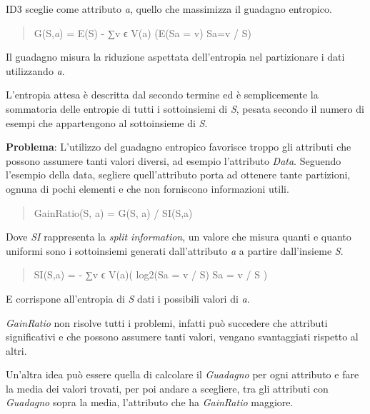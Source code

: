 ID3 sceglie come attributo \emph{a}, quello che massimizza il guadagno
entropico.

\begin{quote}
G(S,\emph{a}) = E(S) - ∑v ϵ V(a) (E(Sa = v) \textbar{}Sa=v\textbar{} /
\textbar{}S\textbar{})
\end{quote}

Il guadagno misura la riduzione aspettata dell'entropia nel partizionare
i dati utilizzando \emph{a}.

L'entropia attesa è descritta dal secondo termine ed è semplicemente la
sommatoria delle entropie di tutti i sottoinsiemi di \emph{S}, pesata
secondo il numero di esempi che appartengono al sottoinsieme di
\emph{S}.

\textbf{Problema}: L'utilizzo del guadagno entropico favorisce troppo
gli attributi che possono assumere tanti valori diversi, ad esempio
l'attributo \emph{Data}. Seguendo l'esempio della data, segliere
quell'attributo porta ad ottenere tante partizioni, ognuna di pochi
elementi e che non forniscono informazioni utili.

\begin{quote}
GainRatio(S, a) = G(S, a) / SI(S,a)
\end{quote}

Dove \emph{SI} rappresenta la \emph{split information}, un valore che
misura quanti e quanto uniformi sono i sottoinsiemi generati
dall'attributo \emph{a} a partire dall'insieme \emph{S}.

\begin{quote}
SI(S,a) = - ∑v ϵ V(a)( log2(\textbar{}Sa = v\textbar{} /
\textbar{}S\textbar{}) \textbar{}Sa = v\textbar{} /
\textbar{}S\textbar{} )
\end{quote}

E corrispone all'entropia di \emph{S} dati i possibili valori di
\emph{a}.

\emph{GainRatio} non risolve tutti i problemi, infatti può succedere che
attributi significativi e che possono assumere tanti valori, vengano
svantaggiati rispetto al altri.

Un'altra idea può essere quella di calcolare il \emph{Guadagno} per ogni
attributo e fare la media dei valori trovati, per poi andare a
scegliere, tra gli attributi con \emph{Guadagno} sopra la media,
l'attributo che ha \emph{GainRatio} maggiore.
